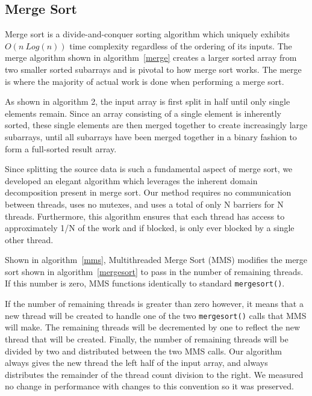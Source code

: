 \documentclass[journal]{IEEEtran}
\begin{document}
%		
%			
%			
%
%    
%

\subsection{Merge Sort}
Merge sort is a divide-and-conquer sorting algorithm which uniquely exhibits $O(n\ Log(n))$ time complexity regardless of the ordering of its inputs.  The merge algorithm shown in algorithm~\ref{merge} creates a larger sorted array from two smaller sorted subarrays and is pivotal to how merge sort works.  The merge is where the majority of actual work is done when performing a merge sort.   

As shown in algorithm 2, the input array is first split in half until only single elements remain.  Since an array consisting of a single element is inherently sorted, these single elements are then merged together to create increasingly large subarrays, until all subarrays have been merged together in a binary fashion to form a full-sorted result array.

Since splitting the source data is such a fundamental aspect of merge sort, we developed an elegant algorithm which leverages the inherent domain decomposition present in merge sort.  Our method requires no communication between threads, uses no mutexes, and uses a total of only N barriers for N threads.  Furthermore, this algorithm ensures that each thread has access to approximately 1/N of the work and if blocked, is only ever blocked by a single other thread.  

Shown in algorithm~\ref{mms}, Multithreaded Merge Sort (MMS) modifies the merge sort shown in algorithm~\ref{mergesort} to pass in the number of remaining threads.  If this number is zero, MMS functions identically to standard \texttt{mergesort()}. 

If the number of remaining threads is greater than zero however, it means that a new thread will be created to handle one of the two \texttt{mergesort()} calls that MMS will make.  The remaining threads will be decremented by one to reflect the new thread that will be created.  Finally, the number of remaining threads will be divided by two and distributed between the two MMS calls.  Our algorithm always gives the new thread the left half of the input array, and always distributes the remainder of the thread count division to the right.  We measured no change in performance with changes to this convention so it was preserved.  
\end{document}
